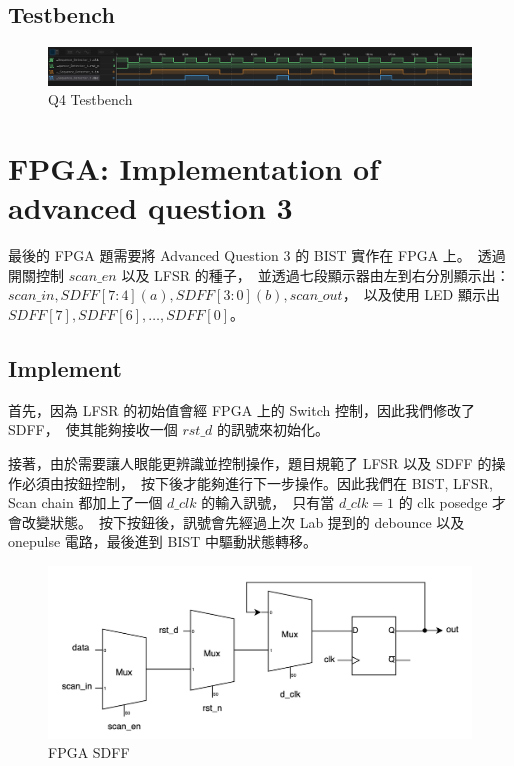 \documentclass[10.5pt,compsoc,UTF8]{CjC}
\theoremstyle{mystyle}
\begin{document}
\subsection{Testbench}

\begin{figure}[h!]
  \centering
  \includegraphics[width=\textwidth]{./img/Q4-tb.png}
  \caption{Q4 Testbench}
  \label{fig:Q4-tb}
\end{figure}

\section{FPGA: Implementation of advanced question 3}

最後的 FPGA 題需要將 Advanced Question 3 的 BIST 實作在 FPGA 上。\
透過開關控制 $scan\_en$ 以及 LFSR 的種子，\
並透過七段顯示器由左到右分別顯示出：$scan\_in, SDFF[7:4] (a), SDFF[3:0] (b), scan\_out$，\
以及使用 LED 顯示出 $SDFF[7], SDFF[6], \dots, SDFF[0]$。
\newpage
\subsection{Implement}

首先，因為 LFSR 的初始值會經 FPGA 上的 Switch 控制，因此我們修改了 SDFF，\
使其能夠接收一個 $rst\_d$ 的訊號來初始化。
\par
接著，由於需要讓人眼能更辨識並控制操作，題目規範了 LFSR 以及 SDFF 的操作必須由按鈕控制，\
按下後才能夠進行下一步操作。因此我們在 BIST, LFSR, Scan chain 都加上了一個 $d\_clk$ 的輸入訊號，\
只有當 $d\_clk = 1$ 的 clk posedge 才會改變狀態。\
按下按鈕後，訊號會先經過上次 Lab 提到的 debounce 以及 onepulse 電路，最後進到 BIST 中驅動狀態轉移。

\begin{figure}[h!]
  \centering
  \includegraphics[width=\textwidth]{./img/FPGA-SDFF.png}
  \caption{FPGA SDFF}
  \label{fig:Q4-SDFF}
\end{figure}
\end{document}
